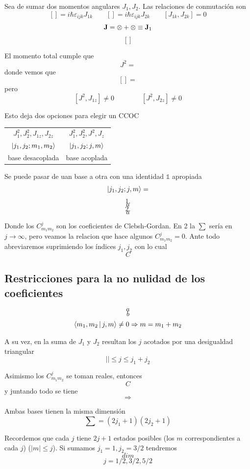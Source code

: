 \documentclass[10pt,oneside]{CBFT_book}
\begin{document}
Sea de sumar dos momentos angulares $J_1, J_2$. Las relaciones de conmutación son
\[
	[] = i\hbar \varepsilon_{ijk}J_{1k} \qquad [] = i\hbar \varepsilon_{ijk}J_{2k} \qquad
	[J_{1k},J_{2k}] = 0
\]
\[
	\vb{J} = \otimes + \otimes \equiv \vb{J}_1
\]
\[
	[]
\]

El momento total  cumple que 
\[
	J^2 = 
\]
donde vemos que 
\[
	[] =
\]
pero 
\[
	[ J^2 , J_{1z}] \neq 0  \qquad \qquad [ J^2 , J_{2z}] \neq 0
\]

Esto deja dos opciones para elegir un CCOC

\begin{center}
\begin{tabular}{|c|c|}
\hline 
$J_1^2, J_2^2, J_{1z}, J_{2z}$ & $J_1^2, J_2^2, J^2, J_{z}$ \\
$\Ket{j_1,j_2;m_1,m_2}$ & $\Ket{j_1,j_2;j,m}$ \\
base desacoplada & base acoplada \\
\hline
\end{tabular}
\end{center}



Se puede pasar de uan base a otra con una identidad $\mathbb{1}$ apropiada
\[
	\Ket{j_1,j_2;j,m} =
\]
\[
	1.
\]
\[
	a
\]
\[
	2.
\]
\[
	a
\]

Donde los $C_{m_1 m_2}^j$ son los coeficientes de Clebsh-Gordan. En 2 la $\sum$ sería en $j\to\infty$, pero veamos la 
relacion que hace algunos $C_{m_1 m_2}^j=0$. Ante todo abreviaremos suprimiendo los índices $j_1,j_2$ con lo cual 
\[
	C
\]

\subsection{Restricciones para la no nulidad de los coeficientes}

\[
	a
\]
\[
	b
\]
\[
	\Braket{m_1,m_2| j,m} \neq 0 \Rightarrow m = m_1 + m_2
\]

A su vez, en la suma de $J_1$ y $J_2$ resultan los $j$ acotados por una desigualdad triangular 
\[
	|| \leq j \leq j_1 + j_2
\]

Asimismo los $C_{m_1 m_2}^j$ se toman reales, entonces 
\[
	C
\]
y juntando todo se tiene 
\[
	\Rightarrow
\]

Ambas bases tienen la misma dimensión
\[
	\sum = (2j_1 + 1)(2j_2 + 1)
\]

Recordemos que cada $j$ tiene $2j+1$ estados posibles (los $m$ correspondientes a cada $j$) ($|m|\leq j$). Si sumamos 
$j_1=1, j_2=3/2$ tendremos 
\[
	dim
\]
\[
	j = 1/2, 3/2, 5/2
\]
\end{document}
